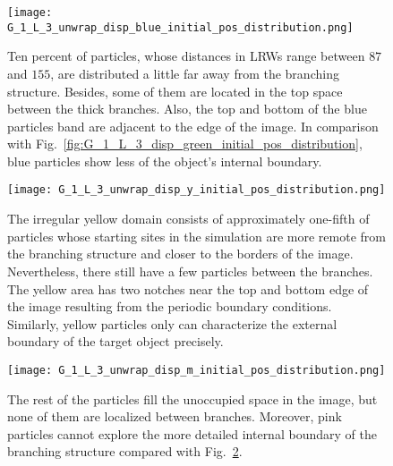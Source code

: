         \begin{figure}
         \centering
         \texttt{[image: G\_1\_L\_3\_unwrap\_disp\_blue\_initial\_pos\_distribution.png]}
         \caption{Ten percent of particles, whose distances in LRWs
           range between $87$ and $155$, are distributed a little far
           away from the branching structure. Besides, some of them
           are located in the top space between the thick
           branches. Also, the top and bottom of the blue particles
           band are adjacent to the edge of the image. In comparison
           with
           Fig.~\ref{fig:G_1_L_3_disp_green_initial_pos_distribution},
           blue particles show less of the object's internal
           boundary.}
         \label{fig:G_1_L_3_disp_blue_initial_pos_distribution}
        \end{figure}


        \begin{figure}
         \centering
         \texttt{[image: G\_1\_L\_3\_unwrap\_disp\_y\_initial\_pos\_distribution.png]}
         \caption{The irregular yellow domain consists of
           approximately one-fifth of particles whose starting sites
           in the simulation are more remote from the branching
           structure and closer to the borders of the
           image. Nevertheless, there still have a few particles
           between the branches. The yellow area has two notches near
           the top and bottom edge of the image resulting from the
           periodic boundary conditions. Similarly, yellow particles
           only can characterize the external boundary of the target
           object precisely.}
         \label{fig:G_1_L_3_disp_yellow_initial_pos_distribution}
        \end{figure}



        \begin{figure}
         \centering
         \texttt{[image: G\_1\_L\_3\_unwrap\_disp\_m\_initial\_pos\_distribution.png]}
         \caption{The rest of the particles fill the unoccupied space
           in the image, but none of them are localized between
           branches. Moreover, pink particles cannot explore the more
           detailed internal boundary of the branching structure
           compared with
           Fig.~\ref{fig:G_1_L_3_disp_yellow_initial_pos_distribution}.}
         \label{fig:G_1_L_3_disp_pink_initial_pos_distribution}
        \end{figure}


